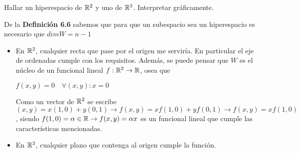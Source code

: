 \item Hallar un hiperespacio de $\mathbb{R}^2$ y uno de $\mathbb{R}^3$. Interpretar gráficamente.
    \begin{mdframed}[style=s]
        De la \textbf{Definición 6.6} sabemos que para que un subespacio sea un hiperespacio es necesario que $dimW=n-1$
        \begin{itemize}
            \item En $\mathbb{R}^2$, cualquier recta que pase por el origen me serviría. En particular el eje de ordenadas cumple con los requisitos. Además, se puede pensar que $W$ es el núcleo de un funcional lineal $f:\mathbb{R}^2\to\mathbb{R}$, osea que 
            \begin{tightcenter}
                $f(x,y)=0\quad\forall (x,y):x=0$
            \end{tightcenter}
            Como un vector de $\mathbb{R}^2$ se escribe $(x,y)=x(1,0)+y(0,1)\to f(x,y)=x f(1,0)+y f(0,1)\to f(x,y)=x f(1,0)$, siendo $f(1,0)=\alpha\in\mathbb{R}\to f(x,y)=\alpha x$ es un funcional lineal que cumple las características mencionadas. 
            \item En $\mathbb{R}^3$, cualquier plano que contenga al origen cumple la función.
        \end{itemize}
    \end{mdframed}
